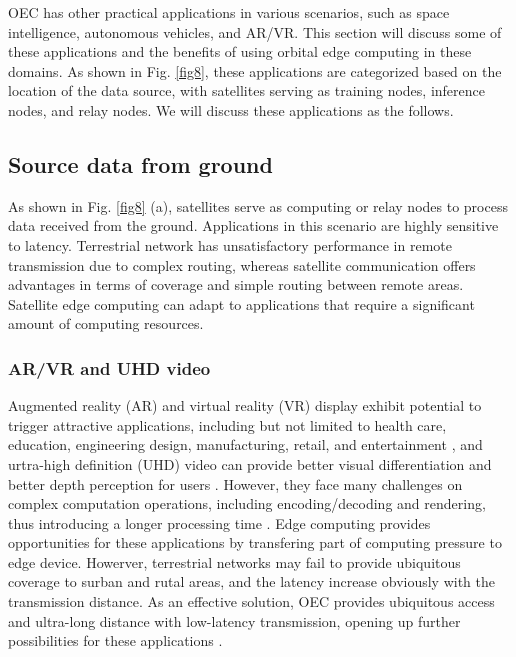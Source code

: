 \documentclass[lettersize,journal]{IEEEtran}
\begin{document}
OEC has other practical applications in various scenarios, such as space intelligence, autonomous vehicles, and AR/VR. This section will discuss some of these applications and the benefits of using orbital edge computing in these domains. As shown in Fig. \ref{fig8}, these applications are categorized based on the location of the data source, with satellites serving as training nodes, inference nodes, and relay nodes. We will discuss these applications as the follows.

\subsection{Source data from ground}
As shown in Fig. \ref{fig8} (a), satellites serve as computing or relay nodes to process data received from the ground. Applications in this scenario are highly sensitive to latency. Terrestrial network has unsatisfactory performance in remote transmission due to complex routing, whereas satellite communication offers advantages in terms of coverage and simple routing between remote areas. Satellite edge computing can adapt to applications that require a significant amount of computing resources.

\subsubsection*{AR/VR and UHD video}
Augmented reality (AR) and virtual reality (VR) display exhibit potential to trigger attractive applications, including but not limited to health care, education, engineering design, manufacturing, retail, and entertainment \cite{RN231}, and urtra-high definition (UHD) video can provide better visual differentiation and better depth perception for users \cite{RN233}. However, they face many challenges on complex computation operations, including encoding/decoding and rendering, thus introducing a longer processing time \cite{RN232}. Edge computing provides opportunities for these applications by transfering part of computing pressure to edge device. Howerver, terrestrial networks may fail to provide ubiquitous coverage to surban and rutal areas, and the latency increase obviously with the transmission distance. As an effective solution, OEC  provides ubiquitous access and ultra-long distance with low-latency transmission, opening up further possibilities for these applications \cite{RN81}. 
\end{document}
